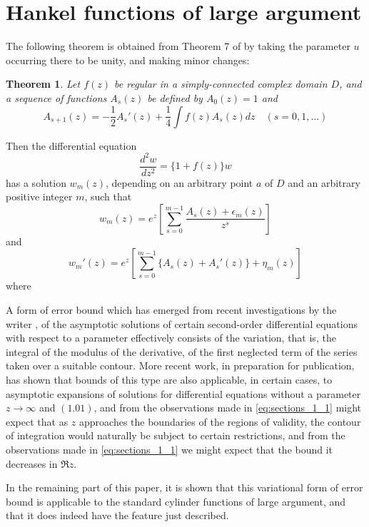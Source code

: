 \documentclass{article}
\newtheorem{theorem}{Theorem}
\begin{document}
\section{Hankel functions of large argument}\label{sec:hankel_functions}

The following theorem is obtained from Theorem 7 of {\cite{reference12}} by
taking the parameter $u$ occurring there to be unity, and making minor
changes:

\begin{theorem}
  \label{thm:hankel_functions}Let $f (z)$ be regular in a simply-connected
  complex domain $D$, and a sequence of functions $A_s (z)$ be defined by $A_0
  (z) = 1$ and
  \begin{equation}
    \label{eq:hankel_recurrence} A_{s + 1} (z) = - \frac{1}{2} A_s' (z) +
    \frac{1}{4}  \int f (z) A_s (z) dz \quad (s = 0, 1, \ldots)
  \end{equation}
\end{theorem}

Then the differential equation
\begin{equation}
  \label{eq:hankel_differential} \frac{d^2 w}{dz^2} = \{1 + f (z)\} w
\end{equation}
has a solution $w_m (z)$, depending on an arbitrary point $a$ of $D$ and an
arbitrary positive integer $m$, such that
\begin{equation}
  \label{eq:hankel_solution} w_m (z) = e^z \left[ \sum_{s = 0}^{m - 1}
  \frac{A_s (z) + \epsilon_m (z)}{z^s} \right]
\end{equation}
and
\begin{equation}
  \label{eq:hankel_solution_prime} w_m' (z) = e^z  \left[ \sum_{s = 0}^{m - 1}
  \{A_s (z) + A_s' (z)\}+ \eta_m (z) \right]
\end{equation}
where

A form of error bound which has emerged from recent investigations by the
writer {\cite{reference12}}, {\cite{reference13}} of the asymptotic solutions
of certain second-order differential equations with respect to a parameter
effectively consists of the variation, that is, the integral of the modulus of
the derivative, of the first neglected term of the series taken over a
suitable contour. More recent work, in preparation for publication, has shown
that bounds of this type are also applicable, in certain cases, to asymptotic
expansions of solutions for differential equations without a parameter $z \to
\infty$ and $(1.01)$, and from the observations made in
\eqref{eq:sections_1_1} might expect that as $z$ approaches the boundaries of
the regions of validity, the contour of integration would naturally be subject
to certain restrictions, and from the observations made in
\eqref{eq:sections_1_1} we might expect that the bound it decreases in $\Re
z$.

In the remaining part of this paper, it is shown that this variational form of
error bound is applicable to the standard cylinder functions of large
argument, and that it does indeed have the feature just described.
\end{document}
